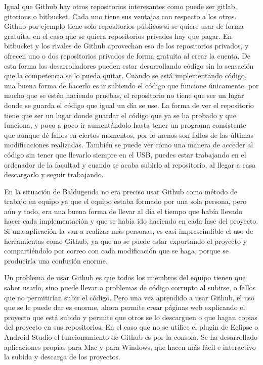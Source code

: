 Igual que Github hay otros repositorios interesantes como puede ser gitlab, gitorious o bitbucket.
Cada uno tiene sus ventajas con respecto a los otros. Github por ejemplo tiene solo repositorios públicos si se quiere usar de forma gratuita, en el caso que se quiera repositorios privados hay que pagar.
En bitbucket y los rivales de Github aprovechan eso de los repositorios privados, y ofrecen uno o dos repositorios privados de forma gratuita al crear la cuenta.
De esta forma los desarrolladores pueden estar desarrollando código sin la sensación que la competencia se lo pueda quitar.
Cuando se está implementando código, una buena forma de hacerlo es ir subiendo el código que funcione únicamente, por mucho que se estén haciendo pruebas, el repositorio no tiene que ser un lugar donde se guarda el código que igual un día se use.
La forma de ver el repositorio tiene que ser un lugar donde guardar el código que ya se ha probado y que funciona, y poco a poco ir aumentándolo hasta tener un programa consistente que aunque dé fallos en ciertos momentos, por lo menos son fallos de las últimas modificaciones realizadas.
También se puede ver cómo una manera de acceder al código sin tener que llevarlo siempre en el USB, puedes estar trabajando en el ordenador de la facultad y cuando se acaba subirlo al repositorio, al llegar a casa descargarlo y seguir trabajando.

En la situación de Baldugenda no era preciso usar Github como método de trabajo en equipo ya que el equipo estaba formado por una sola persona, pero aún y todo, era una buena forma de llevar al día el tiempo que había llevado hacer cada implementación y que se había ido haciendo en cada fase del proyecto.
Si una aplicación la van a realizar más personas, es casi imprescindible el uso de herramientas como Github, ya que no se puede estar exportando el proyecto y compartiéndolo por correo con cada modificación que se haga, porque se produciría una confusión enorme.

Un problema de usar Github es que todos los miembros del equipo tienen que saber usarlo, sino puede llevar a problemas de código corrupto al subirse, o fallos que no permitirían subir el código. Pero una vez aprendido a usar Github, el uso que se le puede dar es enorme, ahora permite crear páginas web explicando el proyecto que está subido y permite que otros se lo descarguen o que hagan copias del proyecto en sus repositorios.
En el caso que no se utilice el plugin de Eclipse o Android Studio el funcionamiento de Github es por la consola. Se ha desarrollado aplicaciones propias para Mac  y para Windows, que hacen más fácil e interactivo la subida y descarga de los proyectos.

